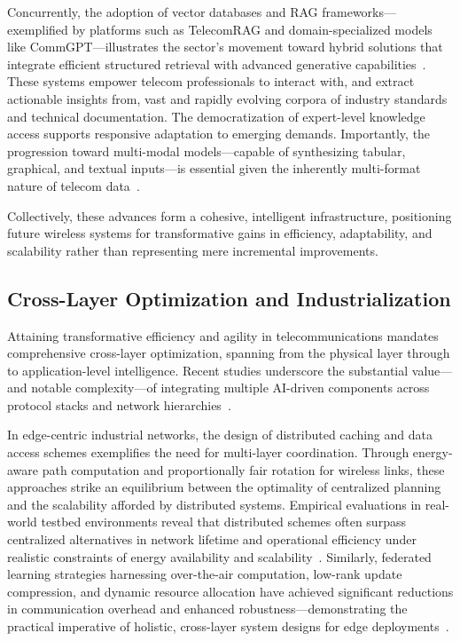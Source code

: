 \documentclass[sigconf]{acmart}
\begin{document}
Concurrently, the adoption of vector databases and RAG frameworks—exemplified by platforms such as TelecomRAG and domain-specialized models like CommGPT—illustrates the sector's movement toward hybrid solutions that integrate efficient structured retrieval with advanced generative capabilities~\cite{ref11,ref22,ref23,ref29}. These systems empower telecom professionals to interact with, and extract actionable insights from, vast and rapidly evolving corpora of industry standards and technical documentation. The democratization of expert-level knowledge access supports responsive adaptation to emerging demands. Importantly, the progression toward multi-modal models—capable of synthesizing tabular, graphical, and textual inputs—is essential given the inherently multi-format nature of telecom data~\cite{ref21,ref29}.

Collectively, these advances form a cohesive, intelligent infrastructure, positioning future wireless systems for transformative gains in efficiency, adaptability, and scalability rather than representing mere incremental improvements.

\subsection{Cross-Layer Optimization and Industrialization}

Attaining transformative efficiency and agility in telecommunications mandates comprehensive cross-layer optimization, spanning from the physical layer through to application-level intelligence. Recent studies underscore the substantial value—and notable complexity—of integrating multiple AI-driven components across protocol stacks and network hierarchies~\cite{ref12, ref14, ref20, ref21, ref24, ref25, ref26, ref29}.

In edge-centric industrial networks, the design of distributed caching and data access schemes exemplifies the need for multi-layer coordination. Through energy-aware path computation and proportionally fair rotation for wireless links, these approaches strike an equilibrium between the optimality of centralized planning and the scalability afforded by distributed systems. Empirical evaluations in real-world testbed environments reveal that distributed schemes often surpass centralized alternatives in network lifetime and operational efficiency under realistic constraints of energy availability and scalability~\cite{ref14}. Similarly, federated learning strategies harnessing over-the-air computation, low-rank update compression, and dynamic resource allocation have achieved significant reductions in communication overhead and enhanced robustness—demonstrating the practical imperative of holistic, cross-layer system designs for edge deployments~\cite{ref12}.
\end{document}
